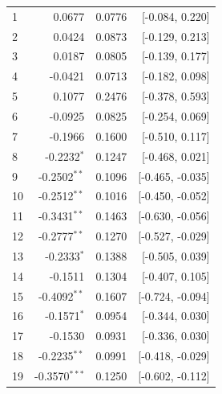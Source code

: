 \begin{longtable}{lrrr}
1 & 0.0677 & 0.0776 & [-0.084, 0.220] \\
2 & 0.0424 & 0.0873 & [-0.129, 0.213] \\
3 & 0.0187 & 0.0805 & [-0.139, 0.177] \\
4 & -0.0421 & 0.0713 & [-0.182, 0.098] \\
5 & 0.1077 & 0.2476 & [-0.378, 0.593] \\
6 & -0.0925 & 0.0825 & [-0.254, 0.069] \\
7 & -0.1966 & 0.1600 & [-0.510, 0.117] \\
8 & -0.2232$^{*}$ & 0.1247 & [-0.468, 0.021] \\
9 & -0.2502$^{**}$ & 0.1096 & [-0.465, -0.035] \\
10 & -0.2512$^{**}$ & 0.1016 & [-0.450, -0.052] \\
11 & -0.3431$^{**}$ & 0.1463 & [-0.630, -0.056] \\
12 & -0.2777$^{**}$ & 0.1270 & [-0.527, -0.029] \\
13 & -0.2333$^{*}$ & 0.1388 & [-0.505, 0.039] \\
14 & -0.1511 & 0.1304 & [-0.407, 0.105] \\
15 & -0.4092$^{**}$ & 0.1607 & [-0.724, -0.094] \\
16 & -0.1571$^{*}$ & 0.0954 & [-0.344, 0.030] \\
17 & -0.1530 & 0.0931 & [-0.336, 0.030] \\
18 & -0.2235$^{**}$ & 0.0991 & [-0.418, -0.029] \\
19 & -0.3570$^{***}$ & 0.1250 & [-0.602, -0.112] \\
\end{longtable}
